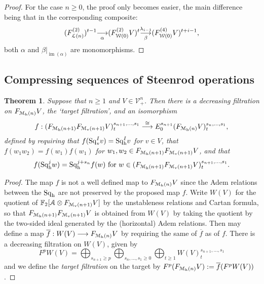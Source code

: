 \documentclass[11pt]{amsart}
\theoremstyle{plain}
\newtheorem{thm}{Theorem}[section]
\theoremstyle{definition}
\DeclareMathOperator{\im}{im}
\renewcommand{\to}{\longrightarrow}
\newcommand{\calW}{\mathcal{W}}
\newcommand{\calA}{\mathcal{A}}
\newcommand{\calV}{\mathcal{V}}
\newcommand{\call}{\mathcal{L}}
\newcommand{\calMv}{\mathcal{M}_\textup{v}}
\newcommand{\calMh}{\mathcal{M}_\textup{h}}
\theoremstyle{plain}
\newcommand{\vect}[2]{\calV^{#1}_{#2}}
\newcommand{\mono}{{\to}}
\newcommand{\Sqh}{\mathrm{Sq}_\textup{h}}
\newcommand{\Sqv}{\mathrm{Sq}_\textup{v}}
\newcommand{\LieSteen}{\calA}
\newcommand{\F}{\mathbb{F}}
\begin{document}
\begin{Cohomology operations for all unstable Lie algebras}
\begin{proof}
For the case $n\geq0$, the proof only becomes easier, the main difference being that in the corresponding composite:
\[(F_{\call(n)}^{(2)})^{t-1}\underset{\smash{\alpha}}{{\to}} (F^{(2)}_{\calW(0)}V)^{t}\underset{\smash{\beta}}{\overset{\lambda_{i-1}}{\mono}} (F^{(4)}_{\calW(0)}V)^{t+i-1},\]
both $\alpha$ and $\beta|_{\im(\alpha)}$ are monomorphisms.
\end{proof}

\subsection{Compressing sequences of Steenrod operations}
\begin{thm}\label{thm on compressing seqs of steenrod ops}
Suppose that $n\geq1$ and $V\in \vect{n}{+}$. Then there is a decreasing filtration on $F_{\calMh(n)}V$, the `target filtration', and an isomorphism
\[ f:(F_{\calMh(n+1)}F_{\calMv(n+1)}V)^{s_{n+1},\ldots,s_1}_t\overset{\cong}{\to} E_0^{s_{n+1}}(F_{\calMh(n)}V)^{s_n,\ldots,s_1}_t,\]
defined by requiring that
$f(\Sqv^Iv)=\Sqh^Iv$ for $v\in V$, that $f(w_1w_2)=f(w_1)f(w_1)$ for $w_1,w_2\in F_{\calMh(n+1)}F_{\calMv(n+1)}V$,
and that
\[f(\Sqh^jw)=\Sqh^{j+s_n}f(w)\textup{ for }w\in (F_{\calMh(n+1)}F_{\calMv(n+1)}V)^{s_{n+1},\ldots,s_1}_t.\]
\end{thm}
\begin{proof}
The map $f$ is not a well defined map to $F_{\calMh(n)}V$ since the Adem relations between the $\Sqh$ are not preserved by the proposed map $f$. Write $W(V)$ for the quotient of $\F_2[\LieSteen\otimes F_{\calMv(n+1)}V]$ by the unstableness relations and Cartan formula, so that $F_{\calMh(n+1)}F_{\calMv(n+1)}V$ is obtained from $W(V)$ by taking the quotient by the two-sided ideal generated by the (horizontal) Adem relations. Then may define a map $\overline{f}:W(V)\to F_{\calMh(n)}V$ by requiring the same of $\overline{f}$ as of $f$. There is a decreasing filtration on $W(V)$, given by 
\[F^pW(V)=\bigoplus_{s_{n+1}\geq p}\bigoplus_{s_n,\ldots,s_1\geq0}\bigoplus_{t\geq1}W(V)^{s_{n+1},\ldots,s_1}_t\]
 and we define the \emph{target filtration} on the target by $F^p(F_{\calMh(n)}V):=\overline{f}(F^pW(V))$.


\end{proof}
\end{Cohomology operations for all unstable Lie algebras}
\end{document}

